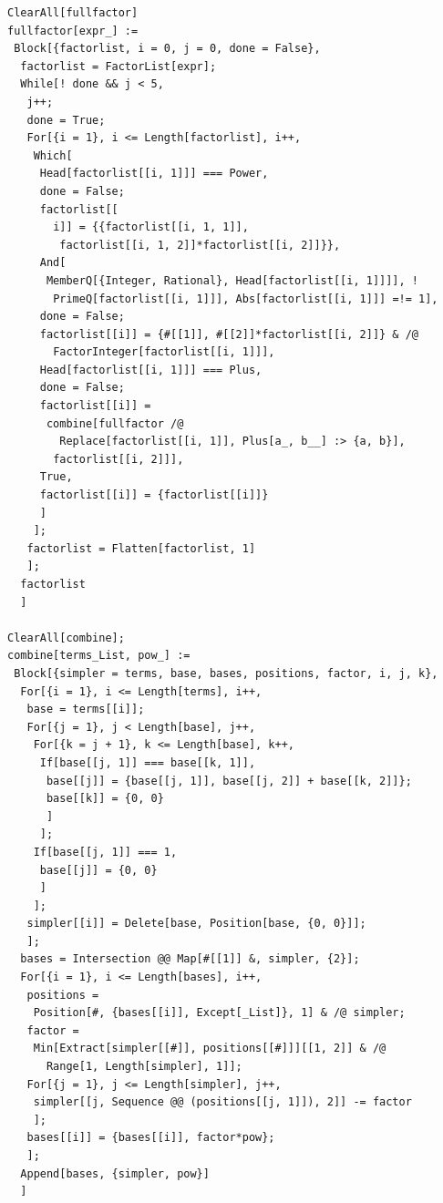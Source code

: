 \documentclass[11pt,letterpaper]{article}
\theoremstyle{definition}
\theoremstyle{remark}
\begin{document}
\begin{lstlisting}
ClearAll[fullfactor]
fullfactor[expr_] :=
 Block[{factorlist, i = 0, j = 0, done = False},
  factorlist = FactorList[expr];
  While[! done && j < 5,
   j++;
   done = True;
   For[{i = 1}, i <= Length[factorlist], i++,
    Which[
     Head[factorlist[[i, 1]]] === Power,
     done = False;
     factorlist[[
       i]] = {{factorlist[[i, 1, 1]], 
        factorlist[[i, 1, 2]]*factorlist[[i, 2]]}},
     And[
      MemberQ[{Integer, Rational}, Head[factorlist[[i, 1]]]], ! 
       PrimeQ[factorlist[[i, 1]]], Abs[factorlist[[i, 1]]] =!= 1],
     done = False;
     factorlist[[i]] = {#[[1]], #[[2]]*factorlist[[i, 2]]} & /@ 
       FactorInteger[factorlist[[i, 1]]],
     Head[factorlist[[i, 1]]] === Plus,
     done = False;
     factorlist[[i]] = 
      combine[fullfactor /@ 
        Replace[factorlist[[i, 1]], Plus[a_, b__] :> {a, b}], 
       factorlist[[i, 2]]],
     True,
     factorlist[[i]] = {factorlist[[i]]}
     ]
    ];
   factorlist = Flatten[factorlist, 1]
   ];
  factorlist
  ]

ClearAll[combine];
combine[terms_List, pow_] :=
 Block[{simpler = terms, base, bases, positions, factor, i, j, k},
  For[{i = 1}, i <= Length[terms], i++,
   base = terms[[i]];
   For[{j = 1}, j < Length[base], j++,
    For[{k = j + 1}, k <= Length[base], k++,
     If[base[[j, 1]] === base[[k, 1]],
      base[[j]] = {base[[j, 1]], base[[j, 2]] + base[[k, 2]]};
      base[[k]] = {0, 0}
      ]
     ];
    If[base[[j, 1]] === 1,
     base[[j]] = {0, 0}
     ]
    ];
   simpler[[i]] = Delete[base, Position[base, {0, 0}]];
   ];
  bases = Intersection @@ Map[#[[1]] &, simpler, {2}];
  For[{i = 1}, i <= Length[bases], i++,
   positions = 
    Position[#, {bases[[i]], Except[_List]}, 1] & /@ simpler;
   factor = 
    Min[Extract[simpler[[#]], positions[[#]]][[1, 2]] & /@ 
      Range[1, Length[simpler], 1]];
   For[{j = 1}, j <= Length[simpler], j++,
    simpler[[j, Sequence @@ (positions[[j, 1]]), 2]] -= factor
    ];
   bases[[i]] = {bases[[i]], factor*pow};
   ];
  Append[bases, {simpler, pow}]
  ]
\end{lstlisting}

\clearpage
\end{document}
